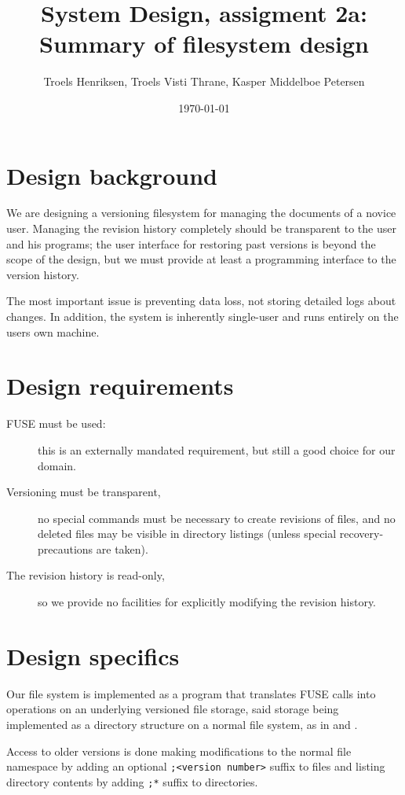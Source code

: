 \documentclass[12pt]{article}
\author{
        Troels Henriksen, Troels Visti Thrane, Kasper Middelboe Petersen
}
\date{\today}
\title{System Design, assigment 2a:\\Summary of filesystem design}
\begin{document}
 
\maketitle
 
\section{Design background}

We are designing a versioning filesystem for managing the documents of
a novice user.  Managing the revision history completely should be
transparent to the user and his programs; the user interface for
restoring past versions is beyond the scope of the design, but we must
provide at least a programming interface to the version history.

The most important issue is preventing data loss, not storing detailed
logs about changes.  In addition, the system is inherently single-user
and runs entirely on the users own machine.

\section{Design requirements}

\begin{description}
\item[FUSE must be used:] this is an externally mandated requirement,
  but still a good choice for our domain.
\item[Versioning must be transparent,] no special commands must be
  necessary to create revisions of files, and no deleted files may be
  visible in directory listings (unless special recovery-precautions
  are taken).
\item[The revision history is read-only,] so we provide no facilities
  for explicitly modifying the revision history.
\end{description}

\section{Design specifics}

Our file system is implemented as a program that translates FUSE calls
into operations on an underlying versioned file storage, said storage
being implemented as a directory structure on a normal file system, as
in \cite{1096690} and \cite{Bustamante04wayback:a}.

Access to older versions is done making modifications to the normal file 
namespace by adding an optional \texttt{;<version number>} suffix to files
and listing directory contents by adding \texttt{;*} suffix to directories.
\end{document}
